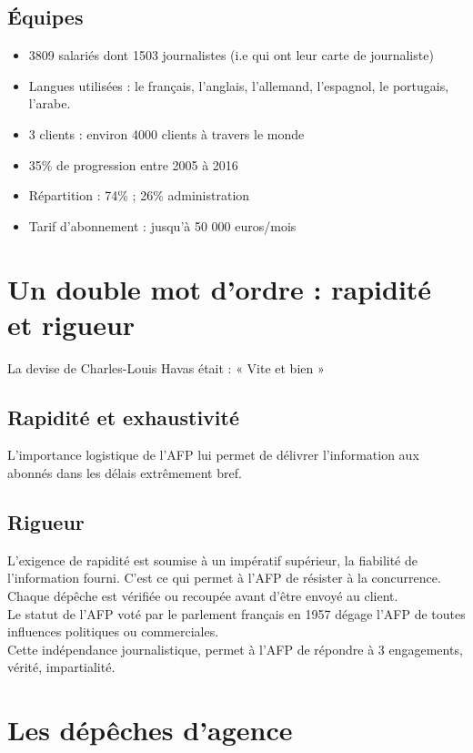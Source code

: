 \documentclass[a4paper,11pt]{report}
\begin{document}
\section{Équipes}
\begin{itemize}
    \item 3809 salariés dont 1503 journalistes (i.e qui ont leur carte de journaliste)
    \item Langues utilisées : le français, l’anglais, l’allemand, l’espagnol, le portugais, l’arabe.
    \item 3 clients : environ 4000 clients à travers le monde
    \item 35\% de progression entre 2005 à 2016
    \item Répartition : 74\% ; 26\% administration
    \item Tarif d’abonnement : jusqu’à 50 000 euros/mois
\end{itemize}

\chapter{Un double mot d’ordre : rapidité et rigueur}
La devise de Charles-Louis Havas était : « Vite et bien »
\section{Rapidité et exhaustivité}
L’importance logistique de l’AFP lui permet de délivrer l’information aux abonnés dans les délais extrêmement bref.
\section{Rigueur}

L’exigence de rapidité est soumise à un impératif supérieur, la fiabilité de l’information fourni. C’est ce qui permet à l’AFP de résister à la concurrence.\\
Chaque dépêche est vérifiée ou recoupée avant d’être envoyé au client.\\
Le statut de l’AFP voté par le parlement français en 1957 dégage l’AFP de toutes influences politiques ou commerciales.\\
Cette indépendance journalistique, permet à l’AFP de répondre à 3 engagements, vérité, impartialité.\\

\chapter{Les dépêches d'agence}
\end{document}

